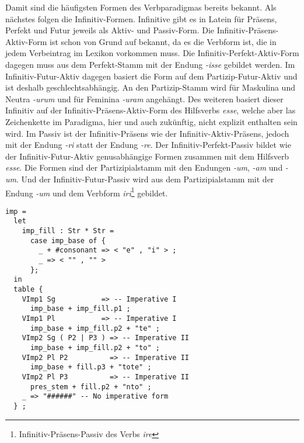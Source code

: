 Damit sind die häufigsten Formen des Verbparadigmas bereits bekannt. Als nächstes folgen die Infinitiv-Formen. Infinitive gibt es in Latein für Präsens, Perfekt und Futur jeweils als Aktiv- und Passiv-Form. Die Infinitiv-Präsens-Aktiv-Form ist schon von Grund auf bekannt, da es die Verbform ist, die in jedem Verbeintrag im Lexikon vorkommen muss. Die Infinitiv-Perfekt-Aktiv-Form dagegen muss aus dem Perfekt-Stamm mit der Endung \textit{-isse} gebildet werden. Im Infinitiv-Futur-Aktiv dagegen basiert die Form auf dem Partizip-Futur-Aktiv und ist deshalb geschlechtsabhängig. An den Partizip-Stamm wird für Maskulina und Neutra \textit{-urum} und für Feminina \textit{-uram} angehängt. Des weiteren basiert dieser Infinitiv auf der Infinitiv-Präsens-Aktiv-Form des Hilfsverbs \textit{esse}, welche aber las Zeichenkette im Paradigma, hier und auch zukünftig, nicht explizit enthalten sein wird. Im Passiv ist der Infinitiv-Präsens wie der Infinitiv-Aktiv-Präsens, jedoch mit der Endung \textit{-ri} statt der Endung \textit{-re}. Der Infinitiv-Perfekt-Passiv bildet wie der Infinitiv-Futur-Aktiv genusabhängige Formen zusammen mit dem Hilfsverb \textit{esse}. Die Formen sind der Partizipialstamm mit den Endungen \textit{-um}, \textit{-am} und \textit{-um}. Und der Infinitiv-Futur-Passiv wird aus dem Partizipialstamm mit der Endung \textit{-um} und dem Verbform \textit{iri}\footnote{Infinitiv-Präsens-Passiv des Verbs \textit{ire}} gebildet.\par
\begin{lstlisting}[float=h!tp,caption={Ausschnitt aus der Funktion \texttt{mkVerb} um Infinitiv-Verbformen zu bilden (vgl. \textbf{ResLat.gf})},label={GF-Res-MkVerb-Imp},basicstyle=\small]
imp = 
  let 
    imp_fill : Str * Str =
      case imp_base of {
        _ + #consonant => < "e" , "i" > ;
        _ => < "" , "" >
      };
  in
  table {
    VImp1 Sg           => -- Imperative I
      imp_base + imp_fill.p1 ;
    VImp1 Pl           => -- Imperative I
      imp_base + imp_fill.p2 + "te" ;
    VImp2 Sg ( P2 | P3 ) => -- Imperative II
      imp_base + imp_fill.p2 + "to" ;
    VImp2 Pl P2          => -- Imperative II
      imp_base + fill.p3 + "tote" ;
    VImp2 Pl P3          => -- Imperative II 
      pres_stem + fill.p2 + "nto" ;
    _ => "######" -- No imperative form
  } ;
\end{lstlisting}
